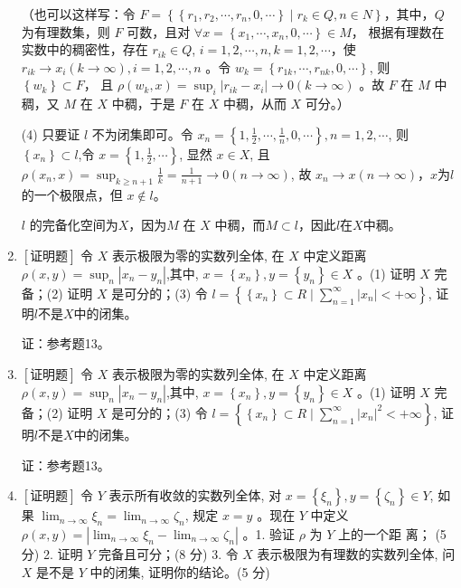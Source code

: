 \documentclass{article}
\begin{document}
\begin{enumerate}
（也可以这样写：令 $F=\left\{\left\{r_1, r_2, \cdots, r_n, 0, \cdots\right\} \mid r_k \in Q, n \in N\right\}$，其中，$Q$ 为有理数集，则 $F$ 可数，且对 $\forall x=\left\{x_1, \cdots, x_n, 0, \cdots\right\} \in M$， 根据有理数在实数中的稠密性，存在 $r_{i k} \in Q$, $i=1,2, \cdots, n, k=1,2, \cdots$，使 $r_{ik} \rightarrow x_i(k \rightarrow \infty), i=1,2, \cdots, n$ 。令 $w_k=\left\{r_{1 k}, \cdots, r_{n k}, 0, \cdots\right\}$, 则 $\left\{w_k\right\} \subset F$， 且 $\rho\left(w_k, x\right)=\sup _i\left|r_{i k}-x_i\right| \rightarrow 0(k \rightarrow \infty)$ 。故 $F$ 在 $M$ 中稠，又 $M$ 在 $X$ 中稠，于是 $F$ 在 $X$ 中稠，从而 $X$ 可分。）



(4) 只要证 $l$ 不为闭集即可。令 $x_n=\left\{1, \frac{1}{2}, \cdots, \frac{1}{n}, 0, \cdots\right\}, n=1,2, \cdots$, 则 $\left\{x_n\right\} \subset l$,令 $x=\left\{1, \frac{1}{2}, \cdots\right\}$, 显然 $x \in X$, 且 $\rho\left(x_n, x\right)=\sup_{k \geq n+1} \frac{1}{k}=\frac{1}{n+1} \rightarrow 0(n \rightarrow \infty)$, 故 $x_n \rightarrow x(n \rightarrow \infty)$，$x$为$l$的一个极限点，但 $x \notin l$。

$l$ 的完备化空间为$X$，因为$M$ 在 $X$ 中稠，而$M \subset l$，因此$l$在$X$中稠。

\item $\left[\textbf{证明题}\right]$ 令 $X$ 表示极限为零的实数列全体, 在 $X$ 中定义距离 $\rho(x, y)=\sup _n\left|x_n-y_n\right|$,其中, $x=\left\{x_n\right\}, y=\left\{y_n\right\} \in X$ 。(1) 证明 $X$ 完备；(2) 证明 $X$ 是可分的；(3) 令 $l=\left\{\left\{x_n\right\} \subset R\mid \sum_{n=1}^{\infty}\left| x_n \right| <+\infty \right\}$, 证明$l$不是$X$中的闭集。

证：参考题13。

\item $\left[\textbf{证明题}\right]$ 令 $X$ 表示极限为零的实数列全体, 在 $X$ 中定义距离 $\rho(x, y)=\sup _n\left|x_n-y_n\right|$,其中, $x=\left\{x_n\right\}, y=\left\{y_n\right\} \in X$ 。(1) 证明 $X$ 完备；(2) 证明 $X$ 是可分的；(3) 令 $l=\left\{\left\{x_n\right\} \subset R\mid \sum_{n=1}^{\infty}\left| x_n \right|^2 <+\infty \right\}$, 证明$l$不是$X$中的闭集。

证：参考题13。


\item $\left[\textbf{证明题}\right]$ 令 $Y$ 表示所有收敛的实数列全体, 对 $x=\left\{\xi_n\right\}, y=\left\{\zeta_n\right\} \in Y$, 如果 $\lim _{n \rightarrow \infty} \xi_n=\lim _{n \rightarrow \infty} \zeta_n$,
规定 $x=y$ 。现在 $Y$ 中定义 $\rho(x, y)=\left|\lim _{n \rightarrow \infty} \xi_n-\lim _{n \rightarrow \infty} \zeta_n\right|$ 。1. 验证 $\rho$ 为 $Y$ 上的一个距
离； (5 分) 2. 证明 $Y$ 完备且可分；(8 分) 3. 令 $X$ 表示极限为有理数的实数列全体, 问 $X$ 是不是 $Y$ 中的闭集, 证明你的结论。(5 分)


\end{enumerate}
\end{document}

